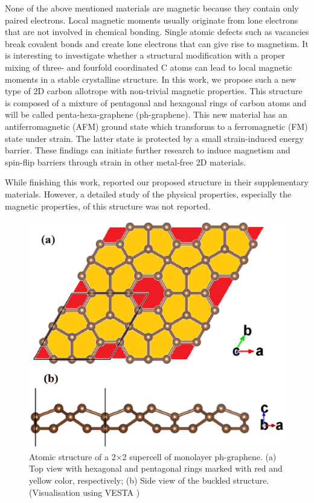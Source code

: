 None of the above mentioned materials are magnetic because they contain only paired electrons. Local magnetic moments usually originate from lone electrons that are not involved in chemical bonding. Single atomic defects such as vacancies break covalent bonds and create lone electrons that can give rise to magnetism. It is interesting to investigate whether a structural modification with a proper mixing of three- and fourfold coordinated C atoms can lead to local magnetic moments in a stable crystalline structure.  In this work, we propose such a new type of 2D carbon allotrope with non-trivial magnetic properties. This structure is composed of a mixture of pentagonal and hexagonal rings of carbon atoms and will be called penta-hexa-graphene (ph-graphene). This new material has an antiferromagnetic (AFM) ground state which transforms to a ferromagnetic (FM) state under strain. The latter state is protected by a small strain-induced energy barrier. These findings can initiate further research to induce magnetism and spin-flip barriers through strain in other metal-free 2D materials.

While finishing this work, \citet{Zhang2016} reported our proposed structure in their supplementary materials. However, a detailed study of the physical properties, especially the magnetic properties, of this structure was not reported. 

\begin{figure}[htbp]
\centering
\includegraphics[width=0.6\linewidth]{PG_structure.eps}%
\caption{Atomic structure of a 2$\times$2 supercell of monolayer ph-graphene. (a) Top view with hexagonal and pentagonal rings marked with red and yellow color, respectively; (b) Side view of the buckled structure. \label{structure} (Visualisation using VESTA \cite{vesta})}
\end{figure}

